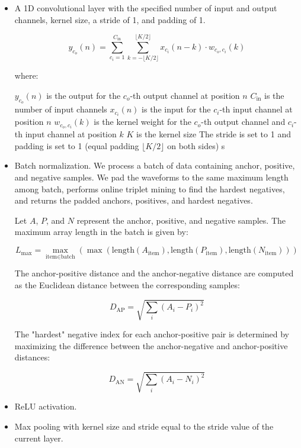 \begin{itemize}
    \item A 1D convolutional layer with the specified number of input and output channels, kernel size, a stride of 1, and padding of 1.

    \begin{equation}
y_{c_o}(n) = \sum_{c_i=1}^{C_{\text{in}}} \sum_{k=-\lfloor K/2 \rfloor}^{\lfloor K/2 \rfloor} x_{c_i}(n - k) \cdot w_{c_o, c_i}(k)
\end{equation}

where:

$y_{c_o}(n)$ is the output for the $c_o$-th output channel at position $n$
$C_{\text{in}}$ is the number of input channels
$x_{c_i}(n)$ is the input for the $c_i$-th input channel at position $n$
$w_{c_o, c_i}(k)$ is the kernel weight for the $c_o$-th output channel and $c_i$-th input channel at position $k$
$K$ is the kernel size
The stride is set to 1 and padding is set to 1 (equal padding $\lfloor K/2 \rfloor$ on both sides)
s
    \item Batch normalization. We process a batch of data containing anchor, positive, and negative samples. We pad the waveforms to the same  maximum length among batch, performs online triplet mining to find the hardest negatives, and returns the padded anchors, positives, and hardest negatives.

    Let $A$, $P$, and $N$ represent the anchor, positive, and negative samples. The maximum array length in the batch is given by:

    \begin{equation}
L_{\text{max}} = \max_{\text{item} \in \text{batch}}(\max(\text{length}(A_{\text{item}}), \text{length}(P_{\text{item}}), \text{length}(N_{\text{item}})))
\end{equation}

    The anchor-positive distance and the anchor-negative distance are computed as the Euclidean distance between the corresponding samples:

    \begin{equation}
D_{\text{AP}} = \sqrt{\sum_{i} (A_i - P_i)^2}
\end{equation}

    The "hardest" negative index for each anchor-positive pair is determined by maximizing the difference between the anchor-negative and anchor-positive distances:

    \begin{equation}
D_{\text{AN}} = \sqrt{\sum_{i} (A_i - N_i)^2}
\end{equation}

    
    \item ReLU activation. 

    
    \item Max pooling with kernel size and stride equal to the stride value of the current layer.
\end{itemize}

